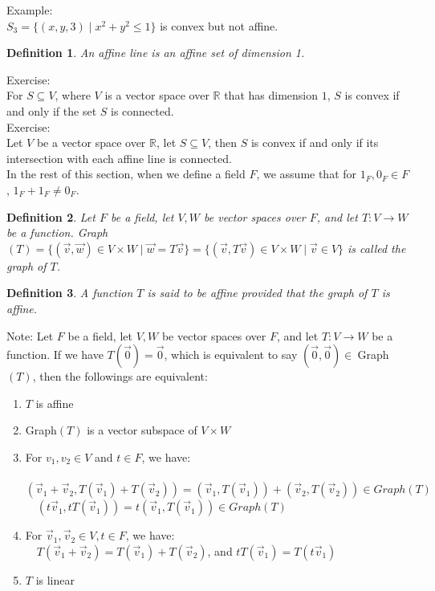 \documentclass[15pt]{book}
\theoremstyle{break}
\theoremstyle{break}
\newtheorem{defn}{Definition}[corL]
\newcommand{\R}{\mathbb{R}}
\newcommand{\note}{\color{red}Note: \color{black}}
\newcommand{\example}{\color{green}Example: \color{black}}
\newcommand{\exercise}{\color{green}Exercise: \color{black}}
\begin{document}
\example\\
$S_3 = \{ (x,y,3)\mid x^2+y^2\leq 1\}$ is convex but not affine.\\

\begin{defn}
An affine line is an affine set of dimension 1.
\end{defn}

\exercise\\
For $S \subseteq V$, where $V$ is a vector space over $\R$ that has dimension $1$, $S$ is convex if and only if the set $S$ is connected. \\

\exercise\\
Let $V$ be a vector space over $\R$, let $S \subseteq V$, then $S$ is convex if and only if its intersection with each affine line is connected.\\

\newpage
In the rest of this section, when we define a field $F$, we assume that for $1_F,0_F \in F$, $1_F+1_F \neq 0_F$.

\begin{defn}
Let $F$ be a field, let $V,W$ be vector spaces over $F$, and let $T:V\to W$ be a function. Graph$(T) = \{(\vec{v}, \vec{w}) \in V\times W\mid \vec{w} = T\vec{v}\} = \{(\vec{v},T\vec{v})\in V\times W \mid \vec{v}\in V\}$ is called the graph of $T$.
\end{defn}

\begin{defn}
A function $T$ is said to be affine provided that the graph of $T$ is affine.
\end{defn}

\note Let $F$ be a field, let $V,W$ be vector spaces over $F$, and let $T:V\to W$ be a function. If we have $T(\vec{0}) = \vec{0}$, which is equivalent to say $(\vec{0},\vec{0})\in\ $Graph$(T)$, then the followings are equivalent:
\begin{enumerate}[topsep=3pt,itemsep=-1ex,partopsep=1ex,parsep=1ex]
\item $T$ is affine
\item Graph$(T)$ is a vector subspace of $V\times W$
\item For $v_1,v_2 \in V$ and $t \in F$, we have:\\${}$\ \ $(\vec{v}_1+\vec{v}_2, T(\vec{v}_1)+T(\vec{v}_2)) = (\vec{v}_1,T(\vec{v}_1))+(\vec{v}_2,T(\vec{v}_2)) \in Graph(T)$\\${}$\ \ $(t\vec{v}_1,tT(\vec{v}_1)) = t(\vec{v}_1,T(\vec{v}_1)) \in Graph(T)$
\item For $\vec{v}_1,\vec{v}_2\in V, t\in F$, we have:\\${}$\ \  $T(\vec{v}_1+\vec{v}_2) = T(\vec{v}_1)+T(\vec{v}_2)$, and $tT(\vec{v}_1) = T(t\vec{v}_1)$
\item $T$ is linear
\end{enumerate}
\end{document}
